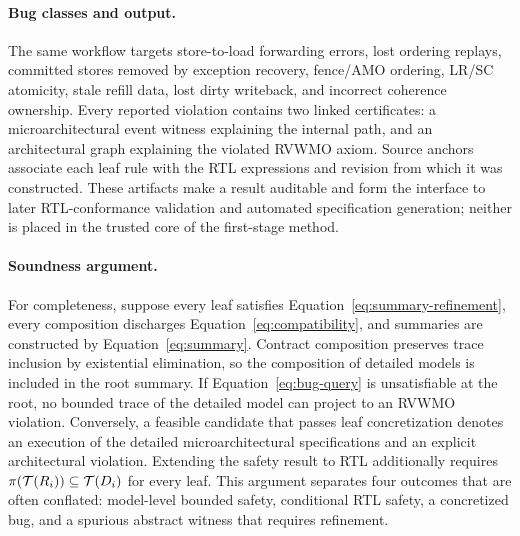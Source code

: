 \paragraph{Bug classes and output.}
The same workflow targets store-to-load forwarding errors, lost ordering
replays, committed stores removed by exception recovery, fence/AMO ordering,
LR/SC atomicity, stale refill data, lost dirty writeback, and incorrect
coherence ownership.  Every reported violation contains two linked
certificates: a microarchitectural event witness explaining the internal path,
and an architectural graph explaining the violated RVWMO axiom.  Source
anchors associate each leaf rule with the RTL expressions and revision from
which it was constructed.  These artifacts make a result auditable and form
the interface to later RTL-conformance validation and automated specification
generation; neither is placed in the trusted core of the first-stage method.

\paragraph{Soundness argument.}
For completeness, suppose every leaf satisfies
Equation~\ref{eq:summary-refinement}, every composition discharges
Equation~\ref{eq:compatibility}, and summaries are constructed by
Equation~\ref{eq:summary}.  Contract composition preserves trace inclusion by
existential elimination, so the composition of detailed models is included in
the root summary.  If Equation~\ref{eq:bug-query} is unsatisfiable at the root,
no bounded trace of the detailed model can project to an RVWMO violation.
Conversely, a feasible candidate that passes leaf concretization denotes an
execution of the detailed microarchitectural specifications and an explicit
architectural violation.  Extending the safety result to RTL additionally
requires $\pi(\mathcal{T}(R_i))\subseteq\mathcal{T}(D_i)$ for every leaf.  This
argument separates four outcomes that are often conflated: model-level bounded
safety, conditional RTL safety, a concretized bug, and a spurious abstract
witness that requires refinement.
